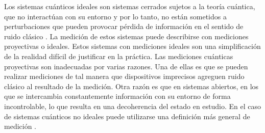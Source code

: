 Los sistemas cuánticos ideales son sistemas cerrados sujetos a la teoría
cuántica, que no interactúan con su entorno y por lo tanto, no están sometidos
a perturbaciones que pueden provocar pérdida de información en el sentido de ruido clásico {\cite{wilde2011classical}}. %
La medición de estos sistemas puede describirse con mediciones
proyectivas o ideales. %
Estos sistemas con mediciones ideales son una
simplificación de la realidad difícil de justificar en la práctica. Las
mediciones cuánticas proyectivas son inadecuadas por varias razones. Una de
ellas es que se pueden realizar mediciones de tal manera que dispositivos
imprecisos agreguen ruido clásico al resultado de la medición. Otra razón es
que 
en sistemas abiertos, en los que se intercambia constantemente información con
su entorno de forma incontrolable, lo que resulta en una decoherencia del
estado en estudio. %
En el caso de sistemas cuánticos no ideales puede utilizarse
una definición más general de medición {\cite{wilde2011classical,
jaeger2007quantum}}.%


